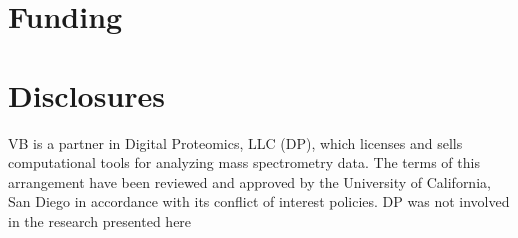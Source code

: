 \documentclass{bioinfo}
\begin{document}
%
%
%
%
%

%
%
%


\section*{Funding}

\section*{Disclosures}
VB is a partner in Digital Proteomics, LLC (DP), which licenses and sells computational tools for analyzing mass spectrometry data. The terms of this arrangement have been reviewed and approved by the University of California, San Diego in accordance with its conflict of interest policies. DP was not involved in the research presented here
%
%
%
%
%
%
%
%
%



\end{document}
